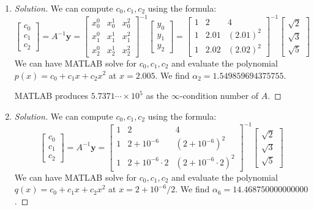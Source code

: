 \documentclass{article}
\begin{document}
\begin{enumerate}
	\item \begin{proof}[Solution]\let\qed\relax
		We can compute $c_0,c_1,c_2$ using the formula:
		\[
			\begin{bmatrix} c_0 \\ c_1 \\ c_2 \end{bmatrix}
			= A^{-1}\mathbf{y} =
			\begin{bmatrix} x_0^0 & x_0^1 & x_0^2\\ x_1^0 & x_1^1 &x_1^2\\
			x_2^0 & x_2^1 & x_2^2\end{bmatrix}^{-1}
			\begin{bmatrix} y_0 \\ y_1 \\ y_2\end{bmatrix}
				= \begin{bmatrix} 1 & 2 & 4 \\ 1 & 2.01 & (2.01)^2\\
				1 & 2.02 & (2.02)^2\end{bmatrix}^{-1}
			\begin{bmatrix} \sqrt{2} \\ \sqrt{3}\\\sqrt{5} \end{bmatrix}
		\]
		We can have MATLAB solve for $c_0,c_1,c_2$ and evaluate the polynomial
		$p(x) = c_0 + c_1 x + c_2 x^2$ at $x = 2.005$.
		We find $\alpha_2 = 1.549859694375755$.

		MATLAB produces $5.7371\cdots \times 10^5$
		as the $\infty$-condition number of $A$.
	\end{proof}
	\item \begin{proof}[Solution]\let\qed\relax
		We can compute $c_0,c_1,c_2$ using the formula:
		\[
			\begin{bmatrix} c_0 \\ c_1 \\ c_2 \end{bmatrix}
			= A^{-1}\mathbf{y} =
			\begin{bmatrix} 1 & 2 & 4 \\1 & 2 + 10^{-6} & (2 + 10^{-6})^2\\
			1 & 2 + 10^{-6}\cdot2 & (2 + 10^{-6}\cdot2)^2\end{bmatrix}^{-1}
			\begin{bmatrix} \sqrt{2} \\ \sqrt{3}\\\sqrt{5} \end{bmatrix}
		\]
		We can have MATLAB solve for $c_0,c_1,c_2$ and evaluate the polynomial
		$q(x) = c_0 + c_1 x + c_2 x^2$ at $x = 2 + 10^{-6}/2$.
		We find $\alpha_6 = 14.468750000000000$.


\end{proof}
\end{enumerate}
\end{document}
